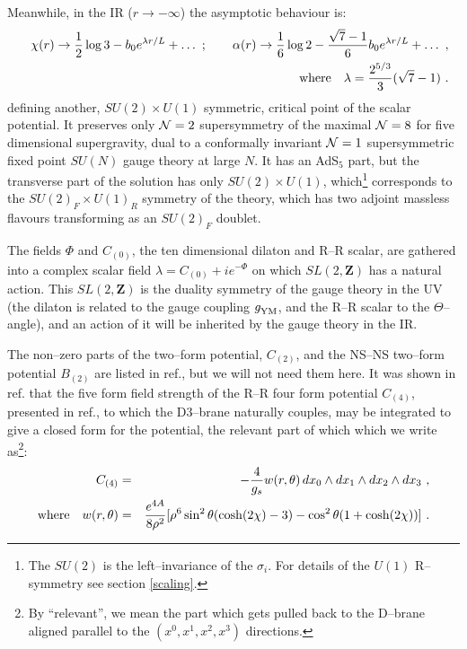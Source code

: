 \documentclass[a4paper,12pt]{article}
\newcommand{\labell}[1]{\label{#1}}
\begin{document}
Meanwhile, in the IR ($r\to-\infty$) the asymptotic behaviour
is\cite{freed1}:
\begin{eqnarray}
&&\chi(r)\to {1\over2}\log 3-b_0e^{\lambda r/L}+\ldots\ ;
\qquad \alpha(r)\to {1\over6}\log 2-{\sqrt{7}-1\over6}b_0 e^{\lambda r/L}
+\ldots\ ,\nonumber \\
&&{\rm where}\quad \lambda={2^{5/3}\over3}(\sqrt{7}-1)\ .
\labell{asympttwo}
\end{eqnarray}
defining another, $SU(2){\times}U(1)$ symmetric, critical point of the
scalar potential\cite{pilch}. It preserves only ${\cal N}=2$
supersymmetry of the maximal ${\cal N}=8$ for five dimensional
supergravity, dual to a conformally invariant ${\cal N}=1$
supersymmetric fixed point $SU(N)$ gauge theory at large $N$. It has
an AdS$_5$ part, but the transverse part of the solution has only
$SU(2){\times}U(1)$, which\footnote{The $SU(2)$ is the
  left--invariance of the $\sigma_i$.  For details of the $U(1)$
  R--symmetry see section \ref{scaling}.}  corresponds to the
$SU(2)_F\times U(1)_R$ symmetry of the theory, which has two adjoint
massless flavours transforming as an $SU(2)_F$ doublet.
  
The fields $\Phi$ and $C_{(0)}$, the ten dimensional dilaton and R--R
scalar, are gathered into a complex scalar field
$\lambda=C_{(0)}+ie^{-\Phi}$ on which $SL(2,{\mathbf Z})$ has a
natural action. This $SL(2,{\mathbf Z})$ is the duality symmetry of
the gauge theory in the UV (the dilaton is related to the gauge
coupling $g_{\rm YM}^{\phantom{2}}$, and the R--R scalar to the
$\Theta$--angle), and an action of it will be inherited by the gauge
theory in the IR. %

The non--zero parts of the two--form potential, $C_{(2)}$, and the
NS--NS two--form potential $B_{(2)}$ are listed in ref.\cite{pw2}, but
we will not need them here.
It was shown in ref.\cite{jlp} that the five form field strength of
the R--R four form potential $C_{(4)}$, presented in ref.\cite{pw2},
to which the D3--brane naturally couples, may be integrated to give a
closed form for the potential, the relevant part of which which we
write as\footnote{By ``relevant'', we mean the part which gets pulled
  back to the D--brane aligned parallel to the $(x^0,x^1,x^2,x^3)$
  directions.}:
\begin{eqnarray} 
C_{(4)}&=& -\frac{4}{g_s}w(r,\theta)\,
 dx_0\wedge dx_1\wedge dx_2 \wedge dx_3\ ,\nonumber \\
{\rm where}\quad  w(r,\theta)&=&
{e^{4A}\over8\rho^2}
[\rho^6\sin^2\theta(\cosh(2\chi)-3)-\cos^2\theta(1+\cosh(2\chi))]\ .
\end{eqnarray}  
\end{document}
